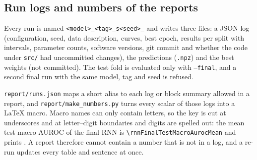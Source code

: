 \subsection{Run logs and numbers of the reports}

Every run is named \texttt{<model>\_<tag>\_s<seed>\_<date-time>} and writes three files: a JSON log
(configuration, seed, data description, curves, best epoch, results per split with intervals, parameter
counts, software versions, git commit and whether the code under \texttt{src/} had uncommitted changes), the
predictions (\texttt{.npz}) and the best weights (not committed). The test fold is evaluated only with
\texttt{--final}, and a second final run with the same model, tag and seed is refused.

\texttt{report/runs.json} maps a short alias to each log or block summary allowed in a report, and
\texttt{report/make\_numbers.py} turns every scalar of those logs into a LaTeX macro. Macro names can only
contain letters, so the key is cut at underscores and at letter--digit boundaries and digits are spelled
out: the mean test macro AUROC of the final RNN is \verb|\rnnFinalTestMacroAurocMean| and prints
\rnnFinalTestMacroAurocMean{}. A report therefore cannot contain a number that is not in a log, and a
re-run updates every table and sentence at once.
